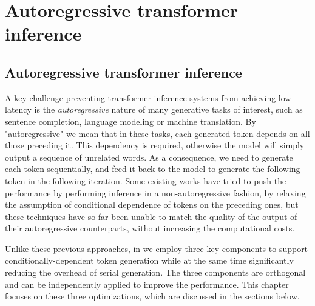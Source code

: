 
\chapter{Autoregressive transformer inference}\label{chapter-5}


\section{Autoregressive transformer inference}

A key challenge preventing transformer inference systems from achieving low latency is the \textit{autoregressive} nature of many generative tasks of interest, such as sentence completion, language modeling or machine translation. By "autoregressive" we mean that in these tasks, each generated token depends on all those preceding it. This dependency is required, otherwise the model will simply output a sequence of unrelated words. As a consequence, we need to generate each token sequentially, and feed it back to the model to generate the following token in the following iteration. Some existing works have tried to push the performance by performing inference in a non-autoregressive fashion, by relaxing the assumption of conditional dependence of tokens on the preceding ones, but these techniques have so far been unable to match the quality of the output of their autoregressive counterparts, without increasing the computational costs.  

Unlike these previous approaches, in \Project we employ three key components to support conditionally-dependent token generation while at the same time significantly reducing the overhead of serial generation. The three components are orthogonal and can be independently applied to improve the performance. This chapter focuses on these three optimizations, which are discussed in the sections below.

